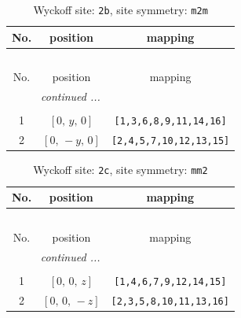 \documentclass[fleqn,8pt]{jsarticle}
\begin{document}
\begin{longtable}{ccc}
\caption{Wyckoff site: {\tt 2b}, site symmetry: {\tt m2m}}
 \\
 \hline \hline
No. & position & mapping \\ \hline \endfirsthead

\multicolumn{2}{l}{\tablename\ \thetable{}} \\
 \hline \hline
No. & position & mapping \\ \hline \endhead

 \hline \hline
\multicolumn{2}{r}{\footnotesize\it continued ...} \\ \endfoot

 \hline \hline
\multicolumn{2}{r}{} \\ \endlastfoot

1 & $\left[ 0,\, y,\, 0 \right]$ & {\tt [1,3,6,8,9,11,14,16]} \\ \hline
2 & $\left[ 0,\, - y,\, 0 \right]$ & {\tt [2,4,5,7,10,12,13,15]} \\
\end{longtable}
\renewcommand{\arraystretch}{1.2}
\begin{longtable}{ccc}
\caption{Wyckoff site: {\tt 2c}, site symmetry: {\tt mm2}}
 \\
 \hline \hline
No. & position & mapping \\ \hline \endfirsthead

\multicolumn{2}{l}{\tablename\ \thetable{}} \\
 \hline \hline
No. & position & mapping \\ \hline \endhead

 \hline \hline
\multicolumn{2}{r}{\footnotesize\it continued ...} \\ \endfoot

 \hline \hline
\multicolumn{2}{r}{} \\ \endlastfoot

1 & $\left[ 0,\, 0,\, z \right]$ & {\tt [1,4,6,7,9,12,14,15]} \\ \hline
2 & $\left[ 0,\, 0,\, - z \right]$ & {\tt [2,3,5,8,10,11,13,16]} \\
\end{longtable}
\renewcommand{\arraystretch}{1.2}
\end{document}
